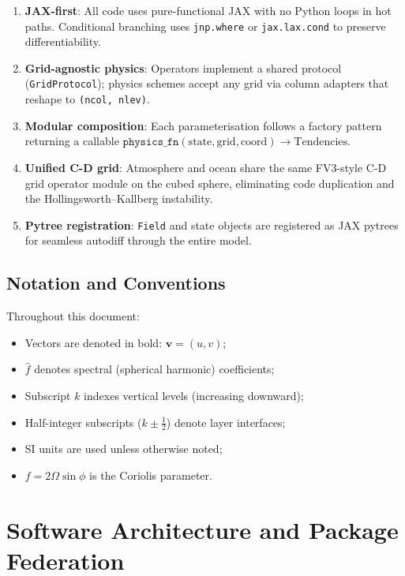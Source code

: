 \documentclass[11pt,twoside]{report}
\newcommand{\half}{\tfrac{1}{2}}
\newcommand{\vect}[1]{\bm{#1}}
\begin{document}
\begin{enumerate}[nosep]
  \item \textbf{JAX-first}: All code uses pure-functional JAX with no
    Python loops in hot paths.  Conditional branching uses
    \texttt{jnp.where} or \texttt{jax.lax.cond} to preserve
    differentiability.
  \item \textbf{Grid-agnostic physics}: Operators implement a shared
    protocol (\texttt{GridProtocol}); physics schemes accept any grid
    via column adapters that reshape to \texttt{(ncol, nlev)}.
  \item \textbf{Modular composition}: Each parameterisation follows a
    factory pattern returning a callable
    $\texttt{physics\_fn}(\text{state}, \text{grid}, \text{coord})
    \to \text{Tendencies}$.
  \item \textbf{Unified C-D grid}: Atmosphere and ocean share the same
    FV3-style C-D grid operator module on the cubed sphere, eliminating
    code duplication and the Hollingsworth--Kallberg instability.
  \item \textbf{Pytree registration}: \texttt{Field} and state objects
    are registered as JAX pytrees for seamless autodiff through the
    entire model.
\end{enumerate}

\section{Notation and Conventions}

Throughout this document:
\begin{itemize}[nosep]
  \item Vectors are denoted in bold: $\vect{v}=(u,v)$;
  \item $\hat{f}$ denotes spectral (spherical harmonic) coefficients;
  \item Subscript $k$ indexes vertical levels (increasing downward);
  \item Half-integer subscripts ($k\pm\half$) denote layer interfaces;
  \item SI units are used unless otherwise noted;
  \item $f = 2\Omega\sin\phi$ is the Coriolis parameter.
\end{itemize}


\chapter{Software Architecture and Package Federation}
\label{ch:architecture}
\end{document}

